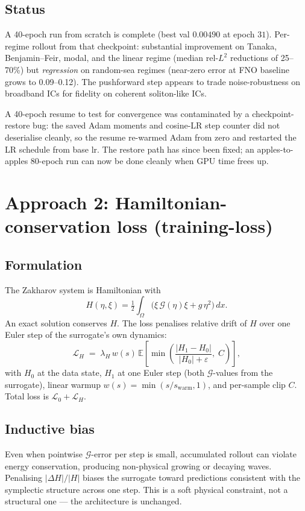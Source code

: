 \documentclass[11pt,letterpaper]{article}
\newcommand{\Gop}{\mathcal{G}}
\newcommand{\Half}{\tfrac{1}{2}}
\begin{document}
\subsection{Status}
A 40-epoch run from scratch is complete (best val $0.00490$ at epoch
$31$). Per-regime rollout from that checkpoint: substantial improvement
on Tanaka, Benjamin--Feir, modal, and the linear regime (median rel-$L^{2}$
reductions of 25--70\%) but \emph{regression} on random-sea regimes
(near-zero error at FNO baseline grows to 0.09--0.12). The pushforward
step appears to trade noise-robustness on broadband ICs for fidelity on
coherent soliton-like ICs.

A 40-epoch resume to test for convergence was contaminated by a
checkpoint-restore bug: the saved Adam moments and cosine-LR step
counter did not deserialise cleanly, so the resume re-warmed Adam from
zero and restarted the LR schedule from base lr. The restore path has
since been fixed; an apples-to-apples 80-epoch run can now be done
cleanly when GPU time frees up.

\section{Approach 2: Hamiltonian-conservation loss (training-loss)}

\subsection{Formulation}
The Zakharov system is Hamiltonian with
\[
  H(\eta,\xi) = \Half\!\int_\Omega \big( \xi\,\Gop(\eta)\xi + g\,\eta^{2}\big)\,dx.
\]
An exact solution conserves $H$. The loss penalises relative drift of $H$
over one Euler step of the surrogate's own dynamics:
\[
  \mathcal{L}_{H} \;=\; \lambda_{H}\,w(s)\,
  \mathbb{E}\!\left[\min\!\left(\frac{|H_{1}-H_{0}|}{|H_{0}|+\varepsilon},\;C\right)\right],
\]
with $H_{0}$ at the data state, $H_{1}$ at one Euler step (both
$\Gop$-values from the surrogate), linear warmup
$w(s)=\min(s/s_{\mathrm{warm}},1)$, and per-sample clip $C$. Total loss
is $\mathcal{L}_{0} + \mathcal{L}_{H}$.

\subsection{Inductive bias}
Even when pointwise $\Gop$-error per step is small, accumulated rollout
can violate energy conservation, producing non-physical growing or
decaying waves. Penalising $|\Delta H|/|H|$ biases the surrogate toward
predictions consistent with the symplectic structure across one step.
This is a soft physical constraint, not a structural one --- the
architecture is unchanged.
\end{document}
